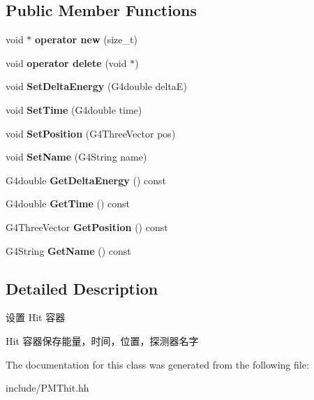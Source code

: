 \subsection*{Public Member Functions}
\begin{DoxyCompactItemize}
\item 
\mbox{\label{classPMThit_a3a8f22237500cbebd0232e95c75d1983}} 
void $\ast$ {\bfseries operator new} (size\+\_\+t)
\item 
\mbox{\label{classPMThit_a9f05cc06463bd5855188f47bcb8d36ee}} 
void {\bfseries operator delete} (void $\ast$)
\item 
\mbox{\label{classPMThit_ae3dd4063284349849402f37858abbe64}} 
void {\bfseries Set\+Delta\+Energy} (G4double deltaE)
\item 
\mbox{\label{classPMThit_a44d1262d477540bbc7084b49e9ac7a9f}} 
void {\bfseries Set\+Time} (G4double time)
\item 
\mbox{\label{classPMThit_a87350831c86e7d49a9ee6a656246ec34}} 
void {\bfseries Set\+Position} (G4\+Three\+Vector pos)
\item 
\mbox{\label{classPMThit_a4cd9d9b804e276177e9fd1d4200d2e70}} 
void {\bfseries Set\+Name} (G4\+String name)
\item 
\mbox{\label{classPMThit_ac886469dc7bcc5e8f0d83de79fe636ee}} 
G4double {\bfseries Get\+Delta\+Energy} () const
\item 
\mbox{\label{classPMThit_a0a9e1a55de9a3964babad3a5f81ad5bb}} 
G4double {\bfseries Get\+Time} () const
\item 
\mbox{\label{classPMThit_ab731ac987db0650157d94673cd5a40be}} 
G4\+Three\+Vector {\bfseries Get\+Position} () const
\item 
\mbox{\label{classPMThit_a497b90707c899f06ca4a1ecfdf537f64}} 
G4\+String {\bfseries Get\+Name} () const
\end{DoxyCompactItemize}


\subsection{Detailed Description}
设置 Hit 容器 

Hit 容器保存能量，时间，位置，探测器名字 

The documentation for this class was generated from the following file\+:\begin{DoxyCompactItemize}
\item 
include/P\+M\+Thit.\+hh\end{DoxyCompactItemize}
